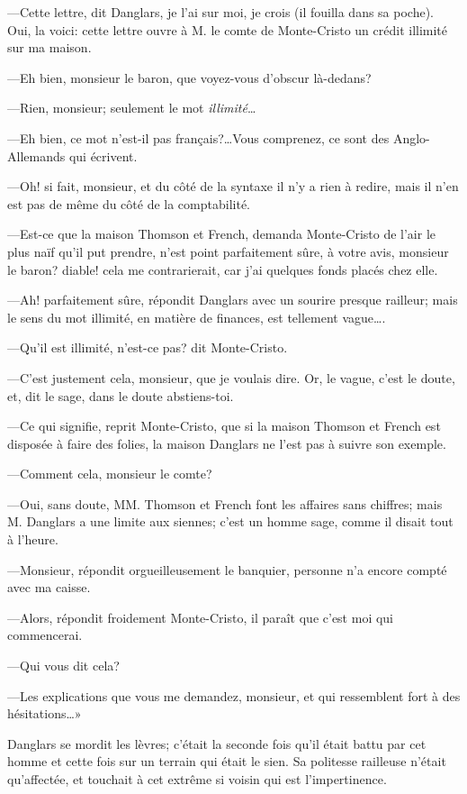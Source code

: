 —Cette lettre, dit Danglars, je l'ai sur moi, je crois (il fouilla dans sa poche). Oui, la voici: cette lettre ouvre à M. le comte de Monte-Cristo un crédit illimité sur ma maison. 

—Eh bien, monsieur le baron, que voyez-vous d'obscur là-dedans? 

—Rien, monsieur; seulement le mot \textit{illimité}\dots 

—Eh bien, ce mot n'est-il pas français?\dots Vous comprenez, ce sont des Anglo-Allemands qui écrivent. 

—Oh! si fait, monsieur, et du côté de la syntaxe il n'y a rien à redire, mais il n'en est pas de même du côté de la comptabilité. 

—Est-ce que la maison Thomson et French, demanda Monte-Cristo de l'air le plus naïf qu'il put prendre, n'est point parfaitement sûre, à votre avis, monsieur le baron? diable! cela me contrarierait, car j'ai quelques fonds placés chez elle. 

—Ah! parfaitement sûre, répondit Danglars avec un sourire presque railleur; mais le sens du mot illimité, en matière de finances, est tellement vague\dots. 

—Qu'il est illimité, n'est-ce pas? dit Monte-Cristo. 

—C'est justement cela, monsieur, que je voulais dire. Or, le vague, c'est le doute, et, dit le sage, dans le doute abstiens-toi. 

—Ce qui signifie, reprit Monte-Cristo, que si la maison Thomson et French est disposée à faire des folies, la maison Danglars ne l'est pas à suivre son exemple. 

—Comment cela, monsieur le comte? 

—Oui, sans doute, MM. Thomson et French font les affaires sans chiffres; mais M. Danglars a une limite aux siennes; c'est un homme sage, comme il disait tout à l'heure.  

—Monsieur, répondit orgueilleusement le banquier, personne n'a encore compté avec ma caisse. 

—Alors, répondit froidement Monte-Cristo, il paraît que c'est moi qui commencerai. 

—Qui vous dit cela? 

—Les explications que vous me demandez, monsieur, et qui ressemblent fort à des hésitations\dots» 

Danglars se mordit les lèvres; c'était la seconde fois qu'il était battu par cet homme et cette fois sur un terrain qui était le sien. Sa politesse railleuse n'était qu'affectée, et touchait à cet extrême si voisin qui est l'impertinence. 

